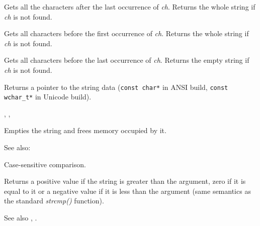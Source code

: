 Gets all the characters after the last occurrence of {\it ch}.
Returns the whole string if {\it ch} is not found.

\label{wxstringbeforefirst}


Gets all characters before the first occurrence of {\it ch}.
Returns the whole string if {\it ch} is not found.

\label{wxstringbeforelast}


Gets all characters before the last occurrence of {\it ch}.
Returns the empty string if {\it ch} is not found.

\label{wxstringcstr}


Returns a pointer to the string data ({\tt const char*} in ANSI build,
{\tt const wchar\_t*} in Unicode build).


, ,

\label{wxstringclear}


Empties the string and frees memory occupied by it.

See also: 

\label{wxstringcmp}



Case-sensitive comparison.

Returns a positive value if the string is greater than the argument, zero if
it is equal to it or a negative value if it is less than the argument (same semantics
as the standard {\it strcmp()} function).

See also , .

\label{wxstringcmpnocase}


